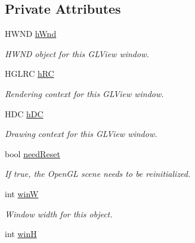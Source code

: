 \subsection*{Private Attributes}
\begin{DoxyCompactItemize}
\item 
\hypertarget{class_viewer3_d_a7e9f17fa00434fc9c2c536eb1b837f0d}{
HWND \hyperlink{class_viewer3_d_a7e9f17fa00434fc9c2c536eb1b837f0d}{hWnd}}
\label{class_viewer3_d_a7e9f17fa00434fc9c2c536eb1b837f0d}

\begin{DoxyCompactList}\small\item\em HWND object for this GLView window. \end{DoxyCompactList}\item 
\hypertarget{class_viewer3_d_a526379cd39ce2ed4fb46ea6e22113611}{
HGLRC \hyperlink{class_viewer3_d_a526379cd39ce2ed4fb46ea6e22113611}{hRC}}
\label{class_viewer3_d_a526379cd39ce2ed4fb46ea6e22113611}

\begin{DoxyCompactList}\small\item\em Rendering context for this GLView window. \end{DoxyCompactList}\item 
\hypertarget{class_viewer3_d_a7e66a4be2e221615c6e2d977ec508798}{
HDC \hyperlink{class_viewer3_d_a7e66a4be2e221615c6e2d977ec508798}{hDC}}
\label{class_viewer3_d_a7e66a4be2e221615c6e2d977ec508798}

\begin{DoxyCompactList}\small\item\em Drawing context for this GLView window. \end{DoxyCompactList}\item 
\hypertarget{class_viewer3_d_ac38c5ff68b2a66426a2c5e69194a2f8c}{
bool \hyperlink{class_viewer3_d_ac38c5ff68b2a66426a2c5e69194a2f8c}{needReset}}
\label{class_viewer3_d_ac38c5ff68b2a66426a2c5e69194a2f8c}

\begin{DoxyCompactList}\small\item\em If true, the OpenGL scene needs to be reinitialized. \end{DoxyCompactList}\item 
\hypertarget{class_viewer3_d_a7bb712193e179498daf85b6959d6315d}{
int \hyperlink{class_viewer3_d_a7bb712193e179498daf85b6959d6315d}{winW}}
\label{class_viewer3_d_a7bb712193e179498daf85b6959d6315d}

\begin{DoxyCompactList}\small\item\em Window width for this object. \end{DoxyCompactList}\item 
\hypertarget{class_viewer3_d_a1275eb91f935aa719172cc0ac99e5b8e}{
int \hyperlink{class_viewer3_d_a1275eb91f935aa719172cc0ac99e5b8e}{winH}}
\label{class_viewer3_d_a1275eb91f935aa719172cc0ac99e5b8e}


\end{DoxyCompactItemize}
